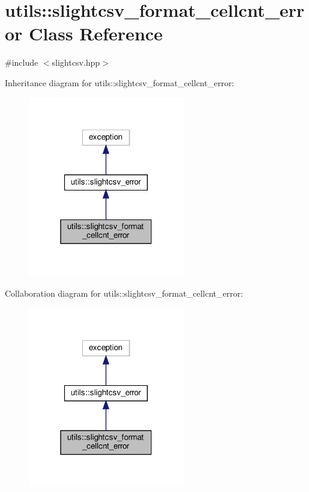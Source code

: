 \hypertarget{classutils_1_1slightcsv__format__cellcnt__error}{}\section{utils\+:\+:slightcsv\+\_\+format\+\_\+cellcnt\+\_\+error Class Reference}
\label{classutils_1_1slightcsv__format__cellcnt__error}


{\ttfamily \#include $<$slightcsv.\+hpp$>$}



Inheritance diagram for utils\+:\+:slightcsv\+\_\+format\+\_\+cellcnt\+\_\+error\+:
\nopagebreak
\begin{figure}[H]
\begin{center}
\leavevmode
\includegraphics[width=193pt]{classutils_1_1slightcsv__format__cellcnt__error__inherit__graph}
\end{center}
\end{figure}


Collaboration diagram for utils\+:\+:slightcsv\+\_\+format\+\_\+cellcnt\+\_\+error\+:
\nopagebreak
\begin{figure}[H]
\begin{center}
\leavevmode
\includegraphics[width=193pt]{classutils_1_1slightcsv__format__cellcnt__error__coll__graph}
\end{center}
\end{figure}


